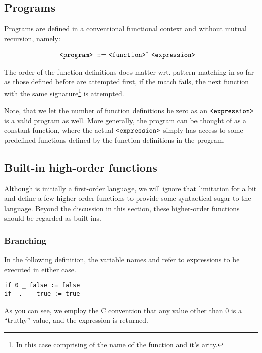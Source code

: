 \subsection{Programs}

Programs are defined in a conventional functional context and without mutual
recursion, namely:

\begin{align}
\text{{\ttfamily<program>}}\ ::=&\ \text{{\ttfamily<function>}}^*\ \text{{\ttfamily<expression>}}
\end{align}

The order of the function definitions does matter wrt. pattern matching in so
far as those defined before are attempted first, if the match fails, the next
function with the same signature\footnote{In this case comprising of the name
of the function and it's arity.} is attempted.

Note, that we let the number of function definitions be zero as an
$\text{{\ttfamily<expression>}}$ is a valid program as well. More generally, the program
can be thought of as a constant function, where the actual
$\text{{\ttfamily<expression>}}$ simply has access to some predefined functions defined
by the function definitions in the program.

\subsection{Built-in high-order
functions}\label{section:language-higher-order-built-ins}

Although  is initially a first-order language, we will ignore that
limitation for a bit and define a few higher-order functions to provide some
syntactical sugar to the language. Beyond the discussion in this section, these
higher-order functions should be regarded as  built-ins.

\subsubsection{Branching}

In the following definition, the variable names  and 
refer to expressions to be executed in either case.

\begin{verbatim}
if 0 _ false := false
if _._ _ true := true
\end{verbatim}

As you can see, we employ the C convention that any value other than $0$ is a
``truthy'' value, and the expression  is returned.


